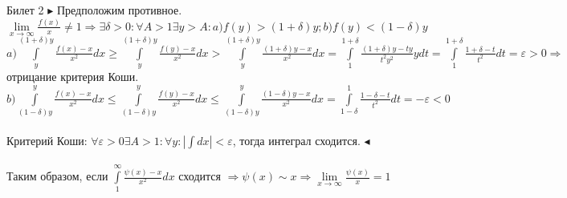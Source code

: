 \documentclass[a4paper,12pt]{article}
\newcommand{\SI}{\psi}
\newcommand{\q}{\quad}
\newcommand{\pb}{\blacktriangleright}
\newcommand{\pe}{\blacktriangleleft}
\newcommand{\Ra}{\Rightarrow}
\newcommand{\IL}{\int\limits}
\begin{document}
\newpage
\begin{mybox2}{{Билет 2}}
$\pb$ Предположим противное. $\lim\limits_{x\to\infty} \frac{f(x)}{x}\not=1\Ra\exists \delta > 0: \forall A > 1 \exists y > A: a) f(y) > (1+\delta)y; b) f(y) < (1-\delta)y$\\
$a)\IL_y^{(1+\delta)y} \frac{f(x) - x}{x^2}dx \ge \IL_y^{(1+\delta)y} \frac{f(y) - x}{x^2}dx > \IL_y^{(1+\delta)y} \frac{(1+\delta)y - x}{x^2}dx = \IL_1^{1+\delta} \frac{(1+\delta)y - ty}{t^2y^2}ydt = \IL_1^{1+\delta} \frac{1+\delta - t}{t^2}dt = \varepsilon > 0\Ra$ отрицание критерия Коши.\\
$b) \IL_{(1-\delta)y}^y  \frac{f(x) - x}{x^2}dx \le \IL_{(1-\delta)y}^y  \frac{f(y) - x}{x^2}dx \le \IL_{(1-\delta)y}^y  \frac{(1-\delta)y - x}{x^2}dx = \IL_{1-\delta}^1 \frac{1-\delta - t}{t^2}dt = -\varepsilon < 0$\\\q\\
Критерий Коши: $\forall \varepsilon > 0 \exists A > 1: \forall y: |\int dx| < \varepsilon$, тогда интеграл сходится. 
$\pe$\\\q\\
Таким образом, если $\IL_1^\infty\frac{\SI(x) - x}{x^2}dx$ сходится $\Ra \SI(x)\sim x\Ra \lim\limits_{x\to\infty}\frac{\SI(x)}{x} = 1$
\end{mybox2}
\end{document}
